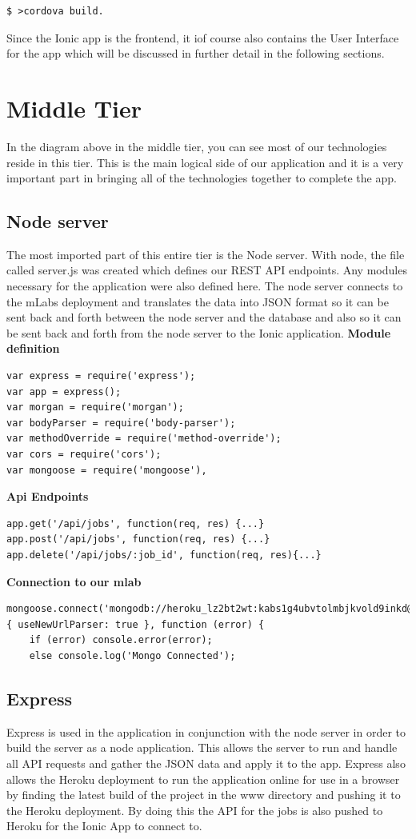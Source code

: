 \begin{verbatim}
$ >cordova build.
\end{verbatim}
Since the Ionic app is the frontend, it iof course also contains the User Interface for the app which will be discussed in further detail in the following sections.
\section{Middle Tier}
In the diagram above in the middle tier, you can see most of our technologies reside in this tier. This is the main logical side of our application and it is a very important part in bringing all of the technologies together to complete the app.
\subsection{ Node server}
The most imported part of this entire tier is the Node server. With node, the file called server.js was created which defines our REST API endpoints. Any modules necessary for the application were also defined here. The node server connects to the mLabs deployment and translates the data into JSON format so it can be sent back and forth between the node server and the database and also so it can be sent back and forth from the node server to the Ionic application.
\textbf {Module definition}
\begin{verbatim}
var express = require('express');
var app = express();
var morgan = require('morgan');
var bodyParser = require('body-parser');
var methodOverride = require('method-override');
var cors = require('cors');
var mongoose = require('mongoose'),
\end{verbatim}
\textbf{Api Endpoints}
\begin{verbatim}
app.get('/api/jobs', function(req, res) {...}
app.post('/api/jobs', function(req, res) {...}
app.delete('/api/jobs/:job_id', function(req, res){...}
\end{verbatim}
\textbf {Connection to our mlab}
\begin{verbatim}
mongoose.connect('mongodb://heroku_lz2bt2wt:kabs1g4ubvtolmbjkvold9inkd@ds227185.mlab.com:27185/heroku_lz2bt2wt',{ useNewUrlParser: true }, function (error) {
    if (error) console.error(error);
    else console.log('Mongo Connected');
\end{verbatim}
\subsection{Express}
Express is used in the application in conjunction with the node server in order to build the server as a node application. This allows the server to run and handle all API requests and gather the JSON data and apply it to the app. Express also allows the Heroku deployment to run the application online for use in a browser by finding the latest build of the project in the www directory and pushing it to the Heroku deployment. By doing this the API for the jobs is also pushed to Heroku for the Ionic App to connect to.


